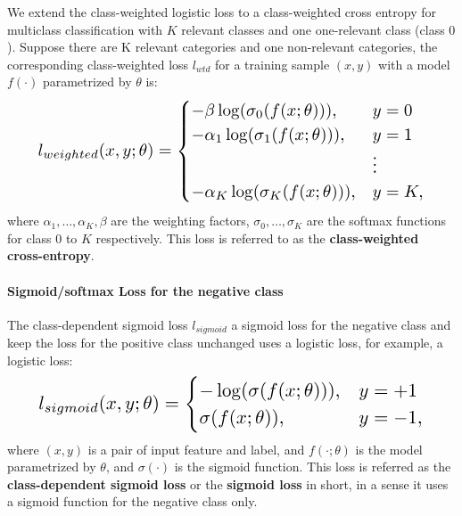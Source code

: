 We extend the class-weighted logistic loss to a class-weighted cross entropy for multiclass classification with $K$ relevant classes and one one-relevant class (class $0$).
Suppose there are K relevant categories and one non-relevant categories, the corresponding class-weighted loss $l_{wtd}$ for a training sample $(x,y)$ with a model $f(\cdot)$ parametrized by $\theta$ is:
\begin{eqnarray}
\resizebox{0.9\columnwidth}{!}{$
l_{weighted}(x, y; \theta) =
  \begin{cases}
    - \beta  \log (\sigma_0(f(x;\theta))), & y = 0 \\
    - \alpha_1 \log (\sigma_1(f(x;\theta))), & y = 1 \\
                                            & \vdots \\
    - \alpha_K \log (\sigma_K(f(x;\theta))), & y = K,
  \end{cases}
$}
\end{eqnarray}
where $\alpha_1, \dots, \alpha_K, \beta$ are the weighting factors, $\sigma_0, \dots, \sigma_K$ are the softmax functions for class $0$ to $K$ respectively.
This loss is referred to as the \textbf{class-weighted cross-entropy}.


\paragraph{Sigmoid/softmax Loss for the negative class}

The class-dependent sigmoid loss $l_{sigmoid}$ a sigmoid loss for the negative class and keep the loss for the positive class unchanged uses a logistic loss, for example, a logistic loss:
\begin{eqnarray}
\resizebox{0.9\columnwidth}{!}{$
l_{sigmoid}(x, y; \theta) =
  \begin{cases}
    - \log (\sigma(f(x; \theta))) , & y = +1 \\
    \sigma(f(x; \theta)), & y = -1,
  \end{cases}
$}
\end{eqnarray}
where $(x, y)$ is a pair of input feature and label, and $f(\cdot;\theta)$ is the model parametrized by $\theta$, and $\sigma(\cdot)$ is the sigmoid function.
This loss is referred as the \textbf{class-dependent sigmoid loss} or the \textbf{sigmoid loss} in short, in a sense it uses a sigmoid function for the negative class only.

